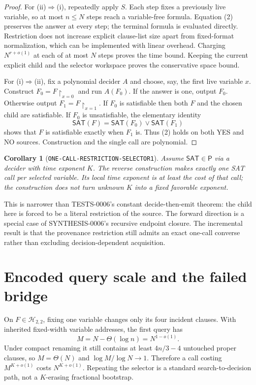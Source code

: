 \documentclass[11pt]{article}
\newtheorem{corollary}[theorem]{Corollary}
\newcommand{\SAT}{\mathsf{SAT}}
\newcommand{\Htwo}{\mathcal H_{2,2}}
\begin{document}
\begin{proof}
For (ii)$\Rightarrow$(i), repeatedly apply $S$.  Each step fixes a previously
live variable, so at most $n\le N$ steps reach a variable-free formula.
Equation (2) preserves the answer at every step; the terminal formula is
evaluated directly.  Restriction does not increase explicit clause-list size
apart from fixed-format normalization, which can be implemented with linear
overhead.  Charging $N^{r+o(1)}$ at each of at most $N$ steps proves the time
bound.  Keeping the current explicit child and the selector workspace proves
the conservative space bound.

For (i)$\Rightarrow$(ii), fix a polynomial decider $A$ and choose, say, the
first live variable $x$.  Construct $F_0=F\upharpoonright_{x=0}$ and run
$A(F_0)$.  If the answer is one, output $F_0$.  Otherwise output
$F_1=F\upharpoonright_{x=1}$.  If $F_0$ is satisfiable then both $F$ and the
chosen child are satisfiable.  If $F_0$ is unsatisfiable, the elementary
identity
\[
 \SAT(F)=\SAT(F_0)\lor\SAT(F_1)                       \tag{3}
\]
shows that $F$ is satisfiable exactly when $F_1$ is.  Thus (2) holds on both
YES and NO sources.  Construction and the single call are polynomial.
\end{proof}

\begin{corollary}[\texttt{ONE-CALL-RESTRICTION-SELECTOR1}]
Assume $\SAT\in\mathsf P$ via a decider with time exponent $K$.  The reverse
construction makes exactly one SAT call per selected variable.  Its local
time exponent is at least the cost of that call; the construction does not
turn unknown $K$ into a fixed favorable exponent.
\end{corollary}

This is narrower than TESTS-0006's constant decide-then-emit theorem: the
child here is forced to be a literal restriction of the source.  The forward
direction is a special case of SYNTHESIS-0006's recursive endpoint closure.
The incremental result is that the provenance restriction still admits an
exact one-call converse rather than excluding decision-dependent acquisition.

\section{Encoded query scale and the failed bridge}

On $F\in\Htwo$, fixing one variable changes only its four incident clauses.
With inherited fixed-width variable addresses, the first query has
\[
 M=N-\Theta(\log n)=N^{1-o(1)}.                         \tag{4}
\]
Under compact renaming it still contains at least $4n/3-4$ untouched proper
clauses, so $M=\Theta(N)$ and $\log M/\log N\to1$.  Therefore a call costing
$M^{K+o(1)}$ costs $N^{K+o(1)}$.  Repeating the selector is a standard
search-to-decision path, not a $K$-erasing fractional bootstrap.
\end{document}
